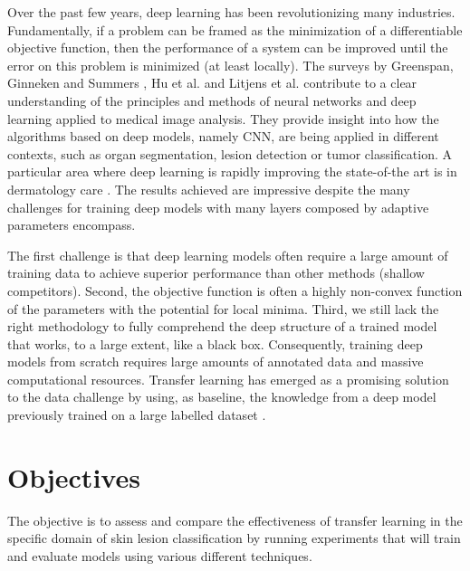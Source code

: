 Over the past few years, deep learning has been revolutionizing many industries. Fundamentally, if a problem can be framed as the minimization of a differentiable objective function, then the performance of a system can be improved until the error on this problem is minimized (at least locally). The surveys by Greenspan, Ginneken and Summers \cite{intro1}, Hu et al. \cite{intro2} and Litjens et al. \cite{intro3} contribute to a clear understanding of the principles and methods of neural networks and deep learning applied to medical image analysis. They provide insight into how the algorithms based on deep models, namely \ac{CNN}, are being applied in different contexts, such as organ segmentation, lesion detection or tumor classification. A particular area where deep learning is rapidly improving the state-of-the art is in dermatology care \cite{nature2017}\cite{intro5}\cite{intro6}. The results achieved are impressive despite the many challenges for training deep models with many layers composed by adaptive parameters encompass.

The first challenge is that deep learning models often require a large amount of training data to achieve superior performance than other methods (shallow competitors). Second, the objective function is often a highly non-convex function of the parameters with the potential for local minima. Third, we still lack the right methodology to fully comprehend the deep structure of a trained model that works, to a large extent, like a black box. Consequently, training deep models from scratch requires large amounts of annotated data and massive computational resources. Transfer learning has emerged as a promising solution to the data challenge by using, as baseline, the knowledge from a deep model previously trained on a large labelled dataset \cite{intro7}\cite{howtransferable}\cite{intro9}.

\section{Objectives}

The objective is to assess and compare the effectiveness of transfer learning in the specific domain of skin lesion classification by running experiments that will train and evaluate models using various different techniques.

